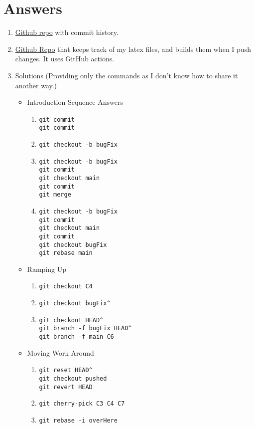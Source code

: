 \documentclass{article}
\begin{document}
    \section*{Answers}
    \begin{enumerate}
        \item \href{https://github.com/advaithca/advaithca.github.io/tree/master}{Github repo} with commit history.
        \item \href{https://github.com/advaithca/latex_repo}{Github Repo} that keeps track of my latex files, and builds them when I push changes. It uses GitHub actions.
        \item Solutions (Providing only the commands as I don't know how to share it another way.)
        \begin{itemize}
            \item Introduction Sequence Answers
            \begin{enumerate}
                \item \verb|git commit| \\ \verb|git commit|
                \item \verb|git checkout -b bugFix|
                \item \verb|git checkout -b bugFix| \\ \verb|git commit| \\ \verb|git checkout main| \\ \verb|git commit| \\ \verb|git merge|
                \item \verb|git checkout -b bugFix| \\ \verb|git commit| \\ \verb|git checkout main| \\ \verb|git commit| \\ \verb|git checkout bugFix| \\ \verb|git rebase main|
            \end{enumerate}
            \item Ramping Up
            \begin{enumerate}
                \item \verb|git checkout C4|
                \item \verb|git checkout bugFix^|
                \item \verb|git checkout HEAD^| \\ \verb|git branch -f bugFix HEAD^| \\ \verb|git branch -f main C6|
            \end{enumerate}
            \item Moving Work Around
            \begin{enumerate}
                \item \verb|git reset HEAD^| \\ \verb|git checkout pushed| \\ \verb|git revert HEAD|
                \item \verb|git cherry-pick C3 C4 C7|
                \item \verb|git rebase -i overHere|
            \end{enumerate}
        \end{itemize}
    \end{enumerate}
\end{document}

